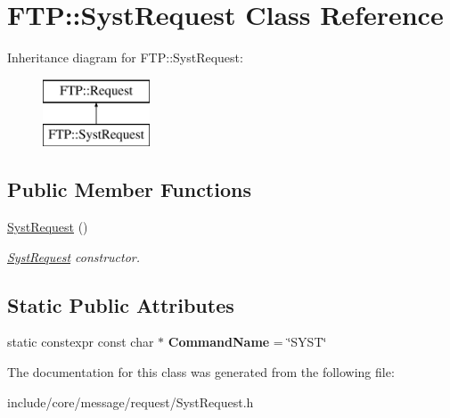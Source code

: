 \hypertarget{class_f_t_p_1_1_syst_request}{\section{F\-T\-P\-:\-:Syst\-Request Class Reference}
\label{class_f_t_p_1_1_syst_request}
}
Inheritance diagram for F\-T\-P\-:\-:Syst\-Request\-:\begin{figure}[H]
\begin{center}
\leavevmode
\includegraphics[height=2.000000cm]{class_f_t_p_1_1_syst_request}
\end{center}
\end{figure}
\subsection*{Public Member Functions}
\begin{DoxyCompactItemize}
\item 
\hypertarget{class_f_t_p_1_1_syst_request_aefe3807c83831af30762ec46f83743af}{\hyperlink{class_f_t_p_1_1_syst_request_aefe3807c83831af30762ec46f83743af}{Syst\-Request} ()}\label{class_f_t_p_1_1_syst_request_aefe3807c83831af30762ec46f83743af}

\begin{DoxyCompactList}\small\item\em \hyperlink{class_f_t_p_1_1_syst_request}{Syst\-Request} constructor. \end{DoxyCompactList}\end{DoxyCompactItemize}
\subsection*{Static Public Attributes}
\begin{DoxyCompactItemize}
\item 
\hypertarget{class_f_t_p_1_1_syst_request_a8342518a6ae8cc1f7de4aef78cbc345e}{static constexpr const char $\ast$ {\bfseries Command\-Name} = \char`\"{}S\-Y\-S\-T\char`\"{}}\label{class_f_t_p_1_1_syst_request_a8342518a6ae8cc1f7de4aef78cbc345e}

\end{DoxyCompactItemize}


The documentation for this class was generated from the following file\-:\begin{DoxyCompactItemize}
\item 
include/core/message/request/Syst\-Request.\-h\end{DoxyCompactItemize}
